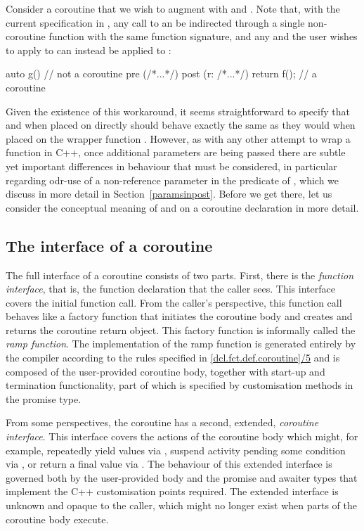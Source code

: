 Consider a coroutine  that we wish to augment with  and . Note that, with the current specification in \cite{P2900R8}, any call to  an be indirected through a single non-coroutine function  with the same function signature, and any  and  the user wishes to apply to  can instead be applied to :
\begin{codeblock}
auto g()  // not a coroutine
  pre (/*...*/) 
  post (r: /*...*/) 
{ 
  return f();  // a coroutine
} 
\end{codeblock}
Given the existence of this workaround, it seems straightforward to specify that  and  when placed on   directly should behave exactly the same  as they would when placed on the wrapper function . However, as with any other attempt to wrap a function in C++, once additional parameters are being passed there are subtle yet important differences in behaviour that must be considered, in particular regarding odr-use of a non-reference parameter in the predicate of , which we discuss in more detail in Section~\ref{paramsinpost}. Before we get there, let us consider the conceptual meaning of  and  on a coroutine declaration in more detail.

\subsection{The interface of a coroutine}

The full interface of a coroutine consists of two parts. First, there is the \emph{function interface}, that is, the function declaration that the caller sees. This interface covers the initial function call. From the caller's perspective, this function call behaves like a factory function that initiates the coroutine body and creates and returns the coroutine return object. This factory function is informally called the \emph{ramp function}. The implementation of the ramp function is generated entirely by the compiler according to the rules specified in \href{https://eel.is/c++draft/dcl.fct.def.coroutine#5}{[dcl.fct.def.coroutine]/5} and is composed of the user-provided coroutine body, together with start-up and termination functionality, part of which is specified by customisation methods in the promise type.

From some perspectives, the coroutine has a second, extended, \emph{coroutine interface}. This interface covers the actions of the coroutine body which might, for example, repeatedly yield values via , suspend activity pending some condition via , or return a final value via .  The behaviour of this extended interface is governed both by the user-provided body and the promise and awaiter types that implement the C++ customisation points required. The extended interface is unknown and opaque to the caller, which might no longer exist when parts of the coroutine body execute.

